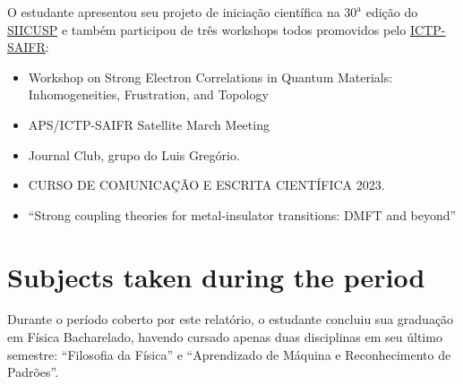\documentclass[12pt]{report}
\begin{document}
O estudante apresentou seu projeto de iniciação científica na $30^{\text{a}}$ edição do \href{https://siicusp.prp.usp.br/pt/home/}{SIICUSP} e também participou de três workshops todos promovidos pelo \href{https://www.ictp-saifr.org/}{ICTP-SAIFR}:
\begin{itemize}
\item Workshop on Strong Electron Correlations in Quantum Materials: Inhomogeneities, Frustration, and Topology
\item APS/ICTP-SAIFR Satellite March Meeting
\item Journal Club, grupo do Luis Gregório.
\item CURSO DE COMUNICAÇÃO E ESCRITA CIENTÍFICA 2023.
\item ``Strong coupling theories for metal-insulator transitions: DMFT and beyond''
\end{itemize}



\chapter{Subjects taken during the period}

Durante o período coberto por este relatório, o estudante concluiu sua graduação em Física Bacharelado, havendo cursado apenas duas disciplinas em seu último semestre: ``Filosofia da Física'' e ``Aprendizado de Máquina e Reconhecimento de Padrões''.

%




\end{document}
